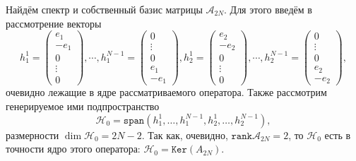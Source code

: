 \documentclass{article}
\begin{document}
Найдём спектр и собственный базис матрицы \( \mathcal{A}_{2N} \).
Для этого введём в рассмотрение векторы
\[ h_1^1 = \begin{pmatrix} e_1 \\ -e_1 \\ 0 \\ \vdots \\ 0 \end{pmatrix}, \cdots, h_1^{N-1} = \begin{pmatrix} 0 \\ \vdots \\ 0 \\ e_1 \\ -e_1 \end{pmatrix},
   h_2^1 = \begin{pmatrix} e_2 \\ -e_2 \\ 0 \\ \vdots \\ 0 \end{pmatrix}, \cdots, h_2^{N-1} = \begin{pmatrix} 0 \\ \vdots \\ 0 \\ e_2 \\ -e_2 \end{pmatrix}, \]
очевидно лежащие в ядре рассматриваемого оператора.
Также рассмотрим генерируемое ими подпространство
\[ \mathcal{H}_0 = \mathtt{span}(h_1^1,\ldots,h_1^{N-1},h_2^1,\ldots,h_2^{N-1}), \]
размерности \( \dim\mathcal{H}_0 = 2N - 2. \)
Так как, очевидно, \( \mathtt{rank}{\mathcal{A}_{2N}} = 2 \),
то \( \mathcal{H}_0 \) есть в точности ядро этого оператора: \( \mathcal{H}_0 = \mathtt{Ker}(A_{2N}) \).
\end{document}
